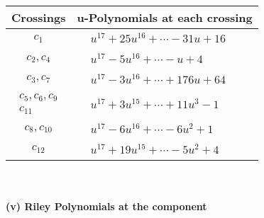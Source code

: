 \documentclass[1p]{elsarticle_modified}
\theoremstyle{definition}
\begin{document}
\begin{tabular}{m{50pt}|m{274pt}}
Crossings & \hspace{64pt}u-Polynomials at each crossing \\
\hline $$\begin{aligned}c_{1}\end{aligned}$$&$\begin{aligned}
&u^{17}+25 u^{16}+\cdots-31 u+16
\end{aligned}$\\
\hline $$\begin{aligned}c_{2},c_{4}\end{aligned}$$&$\begin{aligned}
&u^{17}-5 u^{16}+\cdots- u+4
\end{aligned}$\\
\hline $$\begin{aligned}c_{3},c_{7}\end{aligned}$$&$\begin{aligned}
&u^{17}-3 u^{16}+\cdots+176 u+64
\end{aligned}$\\
\hline $$\begin{aligned}c_{5},c_{6},c_{9}\\c_{11}\end{aligned}$$&$\begin{aligned}
&u^{17}+3 u^{15}+\cdots+11 u^3-1
\end{aligned}$\\
\hline $$\begin{aligned}c_{8},c_{10}\end{aligned}$$&$\begin{aligned}
&u^{17}-6 u^{16}+\cdots-6 u^2+1
\end{aligned}$\\
\hline $$\begin{aligned}c_{12}\end{aligned}$$&$\begin{aligned}
&u^{17}+19 u^{15}+\cdots-5 u^2+4
\end{aligned}$\\
\hline
\end{tabular}\\~\\
\newpage\renewcommand{\arraystretch}{1}
\flushleft \textbf{(v) Riley Polynomials at the component}\newline \\
\end{document}
